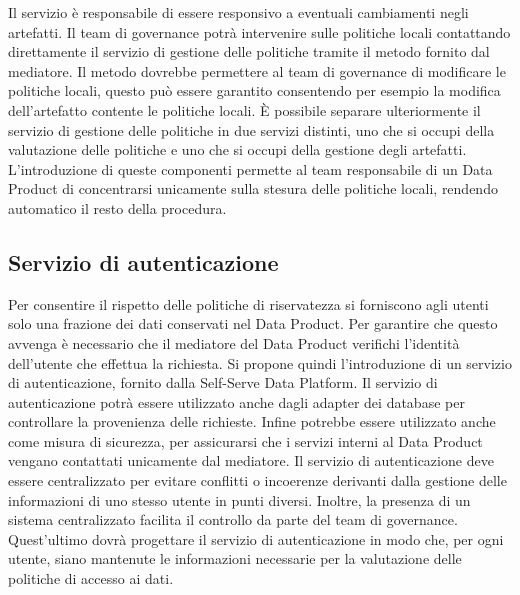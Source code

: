 \documentclass[12pt]{report}
\begin{document}
Il servizio è responsabile di essere responsivo a eventuali cambiamenti negli artefatti.
Il team di governance potrà intervenire sulle politiche locali contattando direttamente il servizio di gestione delle politiche tramite il metodo fornito dal mediatore. 
Il metodo dovrebbe permettere al team di governance di modificare le politiche locali, questo può essere garantito consentendo per esempio la modifica dell'artefatto contente le politiche locali. 
È possibile separare ulteriormente il servizio di gestione delle politiche in due servizi distinti, uno che si occupi della valutazione delle politiche e uno che si occupi della gestione degli artefatti.
L'introduzione di queste componenti permette al team responsabile di un Data Product di concentrarsi unicamente sulla stesura delle politiche locali, rendendo automatico il resto della procedura.

\subsection{Servizio di autenticazione}
Per consentire il rispetto delle politiche di riservatezza si forniscono agli utenti solo una frazione dei dati conservati nel Data Product.
Per garantire che questo avvenga è necessario che il mediatore del Data Product verifichi l'identità dell'utente che effettua la richiesta.
Si propone quindi l'introduzione di un servizio di autenticazione, fornito dalla Self-Serve Data Platform.
Il servizio di autenticazione potrà essere utilizzato anche dagli adapter dei database per controllare la provenienza delle richieste.
Infine potrebbe essere utilizzato anche come misura di sicurezza, per assicurarsi che i servizi interni al Data Product vengano contattati unicamente dal mediatore.
Il servizio di autenticazione deve essere centralizzato per evitare conflitti o incoerenze derivanti dalla gestione delle informazioni di uno stesso utente in punti diversi.
Inoltre, la presenza di un sistema centralizzato facilita il controllo da parte del team di governance.
Quest'ultimo dovrà progettare il servizio di autenticazione in modo che, per ogni utente, siano mantenute le informazioni necessarie per la valutazione delle politiche di accesso ai dati.
\end{document}
